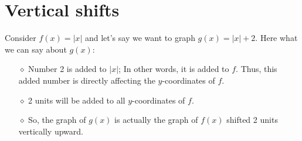 \section{Vertical shifts}
Consider $f(x)=|x|$ and let's say we want to graph $g(x)=|x|+2$. Here what we can say about $g(x)$:
\begin{itemize}
    \item [$\diamond$] Number 2 is added to $|x|$; In other words, it is added to $f$. Thus, this added number is directly affecting the $y$-coordinates of $f$. 
    \item [$\diamond$] 2 units will be added to all $y$-coordinates of $f$.
    \item [$\diamond$] So, the graph of $g(x)$ is actually the graph of $f(x)$ shifted 2 units vertically upward.
\end{itemize}

